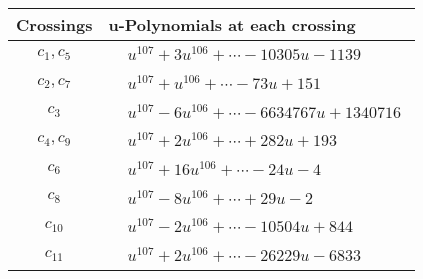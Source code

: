 \documentclass[1p]{elsarticle_modified}
\theoremstyle{definition}
\begin{document}
\begin{tabular}{m{50pt}|m{274pt}}
Crossings & \hspace{64pt}u-Polynomials at each crossing \\
\hline $$\begin{aligned}c_{1},c_{5}\end{aligned}$$&$\begin{aligned}
&u^{107}+3 u^{106}+\cdots-10305 u-1139
\end{aligned}$\\
\hline $$\begin{aligned}c_{2},c_{7}\end{aligned}$$&$\begin{aligned}
&u^{107}+u^{106}+\cdots-73 u+151
\end{aligned}$\\
\hline $$\begin{aligned}c_{3}\end{aligned}$$&$\begin{aligned}
&u^{107}-6 u^{106}+\cdots-6634767 u+1340716
\end{aligned}$\\
\hline $$\begin{aligned}c_{4},c_{9}\end{aligned}$$&$\begin{aligned}
&u^{107}+2 u^{106}+\cdots+282 u+193
\end{aligned}$\\
\hline $$\begin{aligned}c_{6}\end{aligned}$$&$\begin{aligned}
&u^{107}+16 u^{106}+\cdots-24 u-4
\end{aligned}$\\
\hline $$\begin{aligned}c_{8}\end{aligned}$$&$\begin{aligned}
&u^{107}-8 u^{106}+\cdots+29 u-2
\end{aligned}$\\
\hline $$\begin{aligned}c_{10}\end{aligned}$$&$\begin{aligned}
&u^{107}-2 u^{106}+\cdots-10504 u+844
\end{aligned}$\\
\hline $$\begin{aligned}c_{11}\end{aligned}$$&$\begin{aligned}
&u^{107}+2 u^{106}+\cdots-26229 u-6833
\end{aligned}$\\
\hline
\end{tabular}\\~\\
\end{document}
